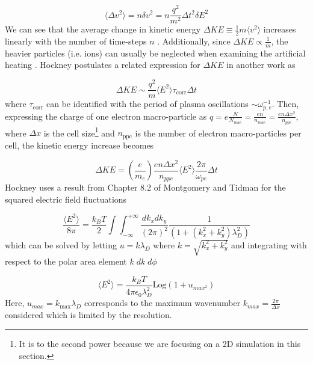 \begin{equation}
	\langle \Delta v^2 \rangle = n \delta v ^2 = n \frac{q^2}{m^2} \Delta t^2 \delta E^2
\end{equation}
We can see that the average change in kinetic energy $\Delta KE \equiv \frac{1}{2} m \langle v^2 \rangle$ increases linearly with the number of time-steps $n$ \cite{Hockney_1988_PIC}. Additionally, since $\Delta KE \propto \frac{1}{m}$, the heavier particles (i.e. ions) can usually be neglected when examining the artificial heating \cite{Hockney_1988_PIC}. Hockney postulates a related expression \cite{Hockney_1971_JoCP} for $\Delta KE$ in another work as 

\begin{equation}
	\Delta KE \sim \frac{q^2}{m} \langle E^2 \rangle \tau_\text{corr} \Delta t
\end{equation}
where $\tau_\text{corr}$ can be identified with the period of plasma oscillations $\sim \omega_{p,e}^{-1}$. Then, expressing the charge of one electron macro-particle as $q = e \frac{N}{N_{mac}} = \frac{e n}{n_{mac}} = \frac{e n \Delta x^2}{n_{ppc}}$, where $\Delta x$ is the cell size\footnote{It is to the second power because we are focusing on a 2D simulation in this section.} and $n_\text{ppc}$ is the number of electron macro-particles per cell, the kinetic energy increase becomes

\begin{equation}
	\Delta KE = (\frac{e}{m_e}) \frac{e n \Delta x^2}{n_{ppc}} \langle E^2 \rangle \frac{2 \pi}{\omega_{pe}} \Delta t \label{eq:deltake}
\end{equation}
Hockney uses a result from Chapter 8.2 of Montgomery and Tidman \cite{Montgomery_1964_Plasma} for the squared electric field fluctuations

\begin{equation} 
	\frac{\langle E^2 \rangle}{8 \pi} = \frac{k_B T}{2} \int \int_{-\infty}^{+\infty} \frac{d k_x d k_y}{(2 \pi)^2} \frac{1}{(1 + (k_x^2 + k_y^2) \lambda_D^2)} 
\end{equation}
which can be solved by letting $u = k \lambda_D$ where $k = \sqrt{k_x^2 + k_y^2}$ and integrating with respect to the polar area element $k \; dk \; d \phi$

\begin{equation}
	\langle E^2 \rangle = \frac{k_B T}{4 \pi \epsilon_0 \lambda_D^2} \text{Log}(1 + u_{max^2}) \label{eq:e2}
\end{equation}
Here, $u_{max} = k_\text{max} \lambda_D$ corresponds to the maximum wavenumber $k_{max} = \frac{2 \pi}{\Delta x}$ considered which is limited by the resolution. 

